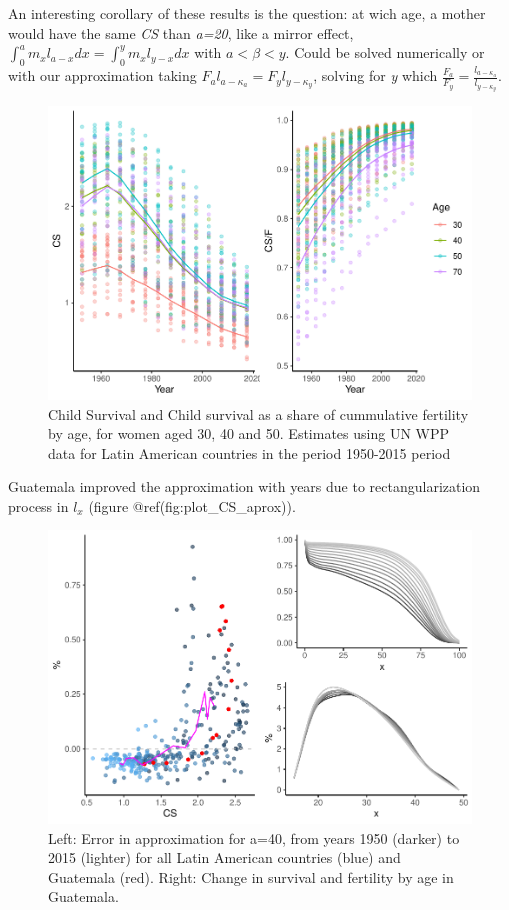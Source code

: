 \documentclass[
]{article}
\begin{document}
An interesting corollary of these results is the question: at wich age,
a mother would have the same \emph{CS} than \emph{a=20}, like a mirror
effect, \(\int_{0}^{a}{m_xl_{a-x}}dx=\int_{0}^{y}{m_xl_{y-x}}dx\) with
\(a<\beta<y\). Could be solved numerically or with our approximation
taking \(F_al_{a-\kappa_a}=F_yl_{y-\kappa_y}\), solving for \emph{y}
which \(\frac{F_a}{F_y} = \frac{l_{a-\kappa_a}}{l_{y-\kappa_y}}\).

\begin{figure}
\centering
\includegraphics{paper_files/figure-latex/plot_CS-1.pdf}
\caption{Child Survival and Child survival as a share of cummulative
fertility by age, for women aged 30, 40 and 50. Estimates using UN WPP
data for Latin American countries in the period 1950-2015 period}
\end{figure}

Guatemala improved the approximation with years due to
rectangularization process in \(l_x\) (figure
@ref(fig:plot\_CS\_aprox)).

\begin{figure}
\centering
\includegraphics{paper_files/figure-latex/plot_CS_aprox-1.pdf}
\caption{Left: Error in approximation for a=40, from years 1950 (darker)
to 2015 (lighter) for all Latin American countries (blue) and Guatemala
(red). Right: Change in survival and fertility by age in Guatemala.}
\end{figure}
\end{document}
